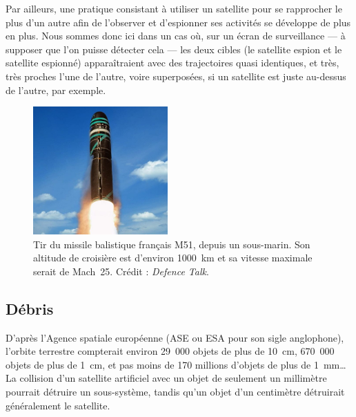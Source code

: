 	Par ailleurs, une pratique consistant à utiliser un satellite pour se rapprocher le plus d'un autre afin de l'observer et d'espionner ses activités se développe de plus en plus. Nous sommes donc ici dans un cas où, sur un écran de surveillance --- à supposer que l'on puisse détecter cela --- les deux cibles (le satellite espion et le satellite espionné) apparaîtraient avec des trajectoires quasi identiques, et très, très proches l'une de l'autre, voire superposées, si un satellite est juste au-dessus de l'autre, par exemple.
	
	
	
	\begin{figure} %
		\centering
		\includegraphics[width=0.46\textwidth]{figures/ch1/m51}
		\caption[Missile français M51.]{Tir du missile balistique français M51, depuis un sous-marin. Son altitude de croisière est d'environ 1000~km et sa vitesse maximale serait de Mach~25\footnotemark. Crédit : \emph{Defence Talk}\footnotemark.}
		\label{fig:m51}
	\end{figure}
	
	\addtocounter{footnote}{-1}
	\addtocounter{footnote}{1}
	
	\subsection{Débris}
	D'après l'Agence spatiale européenne (ASE ou ESA pour son sigle anglophone), l'orbite terrestre compterait environ 29~000 objets de plus de 10~cm, 670~000 objets de plus de 1~cm, et pas moins de 170 millions d'objets de plus de 1~mm\ldots{} La collision d'un satellite artificiel avec un objet de seulement un millimètre pourrait détruire un sous-système, tandis qu'un objet d'un centimètre détruirait généralement le satellite\footnotemark.
	
